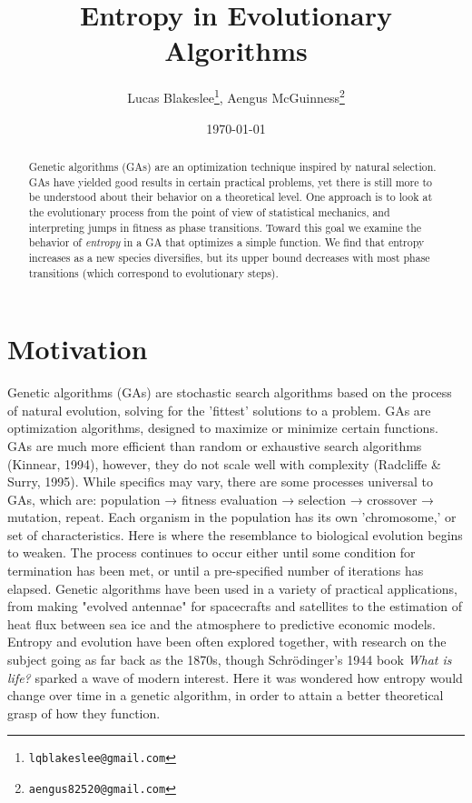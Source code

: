 \documentclass[11pt]{article}
\date{\today}
\title{Entropy in Evolutionary Algorithms}
\author{Lucas Blakeslee\footnote{\texttt{lqblakeslee@gmail.com}},
  Aengus McGuinness\footnote{\texttt{aengus82520@gmail.com}}}
\begin{document}
\maketitle


\label{sec:org26f53e0}
\begin{abstract}
\label{sec:orga17da23}

Genetic algorithms (GAs) are an optimization technique inspired by
natural selection. GAs have yielded good results in certain practical
problems, yet there is still more to be understood about their
behavior on a theoretical level. One approach is to look at the
evolutionary process from the point of view of statistical mechanics,
and interpreting jumps in fitness as phase transitions. Toward this
goal we examine the behavior of \emph{entropy} in a GA that optimizes
a simple function.  We find that entropy increases as a new species
diversifies, but its upper bound decreases with most phase
transitions (which correspond to evolutionary steps).
\end{abstract}




\section{Motivation}
\label{sec:org16abecd}
Genetic algorithms (GAs) are stochastic search algorithms based on the
process of natural evolution, solving for the 'fittest' solutions to a
problem. GAs are optimization algorithms, designed to maximize or
minimize certain functions. GAs are much more efficient than random or
exhaustive search algorithms (Kinnear, 1994), however, they do not
scale well with complexity (Radcliffe \& Surry, 1995). While specifics
may vary, there are some processes universal to GAs, which are:
population → fitness evaluation → selection → crossover → mutation,
repeat. Each organism in the population has its own 'chromosome,' or
set of characteristics. Here is where the resemblance to biological
evolution begins to weaken. The process continues to occur either
until some condition for termination has been met, or until a
pre-specified number of iterations has elapsed. Genetic algorithms
have been used in a variety of practical applications, from making
"evolved antennae" for spacecrafts and satellites to the estimation of
heat flux between sea ice and the atmosphere to predictive economic
models. Entropy and evolution have been often explored together, with
research on the subject going as far back as the 1870s, though
Schrödinger's 1944 book \emph{What is life?} sparked a wave of modern
interest. Here it was wondered how entropy would change over time in a
genetic algorithm, in order to attain a better theoretical grasp of
how they function.
\end{document}
